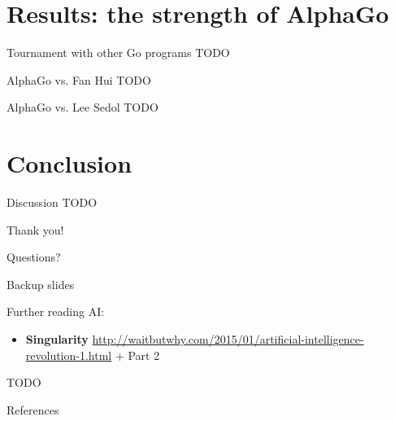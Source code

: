 \documentclass{beamer}
\newcommand{\todo}{\alert{TODO}}
\begin{document}
  \section{Results: the strength of AlphaGo}

  \begin{frame}{Tournament with other Go programs}
    \todo
  \end{frame}

  \begin{frame}{AlphaGo vs. Fan Hui}
    \todo
  \end{frame}

  \begin{frame}{AlphaGo vs. Lee Sedol}
    \todo
  \end{frame}


  \section{Conclusion}

  \begin{frame}{Discussion}
    \todo
  \end{frame}

  \begin{frame}[standout]
    \begin{center}
      Thank you!
      \pause

      Questions?
    \end{center}
  \end{frame}


  \appendix

  \begin{frame}[standout]
    Backup slides
  \end{frame}

  \begin{frame}{Further reading}
    AI:
    \begin{itemize}
      \item \textbf{Singularity} \url{http://waitbutwhy.com/2015/01/artificial-intelligence-revolution-1.html} + Part 2
    \end{itemize}

    \todo
  \end{frame}

  \begin{frame}[allowframebreaks]{References}
    \tiny
    \printbibliography[heading=none]
  \end{frame}
\end{document}
